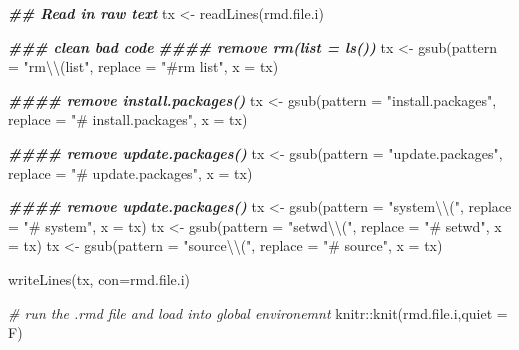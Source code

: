 \documentclass[
]{book}
\newenvironment{Shaded}{\begin{snugshade}}{\end{snugshade}}
\newcommand{\AttributeTok}[1]{\textcolor[rgb]{0.77,0.63,0.00}{#1}}
\newcommand{\CommentTok}[1]{\textcolor[rgb]{0.56,0.35,0.01}{\textit{#1}}}
\newcommand{\DocumentationTok}[1]{\textcolor[rgb]{0.56,0.35,0.01}{\textbf{\textit{#1}}}}
\newcommand{\FunctionTok}[1]{\textcolor[rgb]{0.00,0.00,0.00}{#1}}
\newcommand{\NormalTok}[1]{#1}
\newcommand{\OtherTok}[1]{\textcolor[rgb]{0.56,0.35,0.01}{#1}}
\newcommand{\SpecialCharTok}[1]{\textcolor[rgb]{0.00,0.00,0.00}{#1}}
\newcommand{\StringTok}[1]{\textcolor[rgb]{0.31,0.60,0.02}{#1}}
\begin{document}
\begin{Shaded}
\begin{Highlighting}[]
\DocumentationTok{\#\# Read in raw text}
\NormalTok{tx  }\OtherTok{\textless{}{-}} \FunctionTok{readLines}\NormalTok{(rmd.file.i)}

\DocumentationTok{\#\#\# clean bad code}
\DocumentationTok{\#\#\#\# remove rm(list = ls())}
\NormalTok{tx  }\OtherTok{\textless{}{-}} \FunctionTok{gsub}\NormalTok{(}\AttributeTok{pattern =} \StringTok{"rm}\SpecialCharTok{\textbackslash{}\textbackslash{}}\StringTok{(list"}\NormalTok{, }\AttributeTok{replace =} \StringTok{"\#rm list"}\NormalTok{, }\AttributeTok{x =}\NormalTok{ tx)}

\DocumentationTok{\#\#\#\# remove install.packages()}
\NormalTok{tx  }\OtherTok{\textless{}{-}} \FunctionTok{gsub}\NormalTok{(}\AttributeTok{pattern =} \StringTok{"install.packages"}\NormalTok{, }\AttributeTok{replace =} \StringTok{"\# install.packages"}\NormalTok{, }\AttributeTok{x =}\NormalTok{ tx)}

\DocumentationTok{\#\#\#\# remove update.packages()}
\NormalTok{tx  }\OtherTok{\textless{}{-}} \FunctionTok{gsub}\NormalTok{(}\AttributeTok{pattern =} \StringTok{"update.packages"}\NormalTok{, }\AttributeTok{replace =} \StringTok{"\# update.packages"}\NormalTok{, }\AttributeTok{x =}\NormalTok{ tx)}

\DocumentationTok{\#\#\#\# remove update.packages()}
\NormalTok{tx  }\OtherTok{\textless{}{-}} \FunctionTok{gsub}\NormalTok{(}\AttributeTok{pattern =} \StringTok{"system}\SpecialCharTok{\textbackslash{}\textbackslash{}}\StringTok{("}\NormalTok{, }\AttributeTok{replace =} \StringTok{"\# system"}\NormalTok{, }\AttributeTok{x =}\NormalTok{ tx)}
\NormalTok{tx  }\OtherTok{\textless{}{-}} \FunctionTok{gsub}\NormalTok{(}\AttributeTok{pattern =} \StringTok{"setwd}\SpecialCharTok{\textbackslash{}\textbackslash{}}\StringTok{("}\NormalTok{, }\AttributeTok{replace =} \StringTok{"\# setwd"}\NormalTok{, }\AttributeTok{x =}\NormalTok{ tx)}
\NormalTok{tx  }\OtherTok{\textless{}{-}} \FunctionTok{gsub}\NormalTok{(}\AttributeTok{pattern =} \StringTok{"source}\SpecialCharTok{\textbackslash{}\textbackslash{}}\StringTok{("}\NormalTok{, }\AttributeTok{replace =} \StringTok{"\# source"}\NormalTok{, }\AttributeTok{x =}\NormalTok{ tx)}



\FunctionTok{writeLines}\NormalTok{(tx, }\AttributeTok{con=}\NormalTok{rmd.file.i)}

\CommentTok{\# run the .rmd file and load into global environemnt}
\NormalTok{knitr}\SpecialCharTok{::}\FunctionTok{knit}\NormalTok{(rmd.file.i,}\AttributeTok{quiet =}\NormalTok{ F)}


\end{Highlighting}
\end{Shaded}
\end{document}
